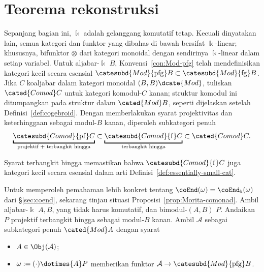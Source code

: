 
\section{Teorema rekonstruksi}\label{sec:Tannaka-coend}
\hypertarget{o014.aljabr2.chapter9.reconstruction-a}{ }
Sepanjang bagian ini, $\Bbbk$ adalah gelanggang komutatif tetap. Kecuali
dinyatakan lain, semua kategori dan funktor yang dibahas di bawah bersifat
$\Bbbk$-linear; khususnya, bifunktor $\otimes$ dari kategori monoidal
dengan sendirinya $\Bbbk$-linear dalam setiap variabel. Untuk aljabar-$\Bbbk$
$B$, Konvensi~\ref{con:Mod-pfg} telah mendefinisikan kategori kecil secara
esensial
$\catesubd{Mod}{\mathrm{pfg}}B\subset
\catesubd{Mod}{\mathrm{fg}}B$. Jika $C$ koaljabar dalam kategori monoidal
$(B,B)\dcate{Mod}$, tuliskan $\cated{Comod}C$ untuk kategori komodul-$C$
kanan; struktur komodul ini ditumpangkan pada struktur dalam
$\cated{Mod}B$, seperti dijelaskan setelah Definisi~\ref{def:cogebroid}.
Dengan memberlakukan syarat projektivitas dan keterhinggaan sebagai
modul-$B$ kanan, diperoleh subkategori penuh
\[ \underbracket{\catesubd{Comod}{\mathrm{pf}}C}_{\text{projektif + terbangkit hingga}} \subset \underbracket{\catesubd{Comod}{\mathrm{f}}C}_{\text{terbangkit hingga}} \subset \cated{Comod}C. \]

Syarat terbangkit hingga memastikan bahwa
$\catesubd{Comod}{\mathrm f}C$ juga kategori kecil secara esensial dalam
arti Definisi~\ref{def:essentially-small-cat}.

Untuk memperoleh pemahaman lebih konkret tentang
$\coEnd(\omega)=\coEnd_{\Bbbk}(\omega)$ dari \S\ref{sec:coend}, sekarang
tinjau situasi Proposisi~\ref{prop:Morita-comonad}. Ambil
aljabar-$\Bbbk$ $A,B$, yang tidak harus komutatif, dan bimodul-$(A,B)$
$P$. Andaikan $P$ projektif terbangkit hingga sebagai modul-$B$ kanan.
Ambil $\mathcal{A}$ sebagai subkategori penuh $\cated{Mod}A$ dengan
syarat
\begin{itemize}
	\item $A\in\Obj(\mathcal{A})$;
	\item $\omega:=(\mathord\cdot)\dotimes{A}P$ memberikan funktor
	$\mathcal{A}\to\catesubd{Mod}{\mathrm{pfg}}B$.
\end{itemize}

